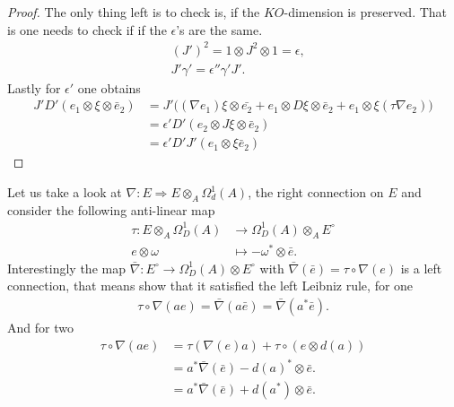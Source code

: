 \begin{proof}
    The only thing left is to check is, if the $KO$-dimension is preserved.
    That is one needs to check if if the $\epsilon$'s are the same.
    \begin{align}
        &(J')^2 = 1 \otimes J^2 \otimes 1 = \epsilon,\\
        &J' \gamma '= \epsilon ''\gamma'J'.
    \end{align}
    Lastly for $\epsilon '$ one obtains
    \begin{align}
        J'D'(e_1 \otimes \xi \otimes \bar{e}_2)&=J'\big((\nabla e_1) \xi \otimes
        \bar{e_2} + e_1 \otimes D\xi \otimes \bar{e}_2 + e_1 \otimes \xi (\tau
        \nabla e_2)\big)\nonumber \\
        &= \epsilon' D'\left(e_2 \otimes J\xi \otimes \bar{e}_2\right)\nonumber\\
        &= \epsilon' D'J'\left(e_1 \otimes \xi \bar{e}_2\right)
    \end{align}
\end{proof}

Let us take a look at $\nabla : E \Rightarrow E \otimes _A \Omega _d^1 (A)$,
the right connection on $E$ and consider the following anti-linear map
\begin{align}
    \tau : E \otimes_A \Omega _D^1 (A) &\rightarrow \Omega _D^1 (A) \otimes_A E^\circ\\
            e \otimes \omega &\mapsto -\omega ^* \otimes \bar{e}.
\end{align}
Interestingly the map $\bar{\nabla} : E^\circ \rightarrow \Omega _D^1(A) \otimes E^\circ$
with $\bar{\nabla}(\bar{e}) = \tau \circ \nabla(e)$ is a left connection, that means
show that it satisfied the left Leibniz rule, for one
\begin{align}
    \tau \circ \nabla(ae) = \bar{\nabla}(a\bar{e}) = \bar{\nabla}(a^*
    \bar{e}).
\end{align}
And for two
\begin{align}
    \tau \circ \nabla(ae) &= \tau(\nabla(e)a) + \tau \circ(e \otimes
     d(a))\nonumber \\
     &=a^*\bar{\nabla}(\bar{e}) - d(a)^* \otimes \bar{e}. \nonumber\\
     &= a^*\bar{\nabla}(\bar{e}) + d(a^*) \otimes \bar{e}.
\end{align}

